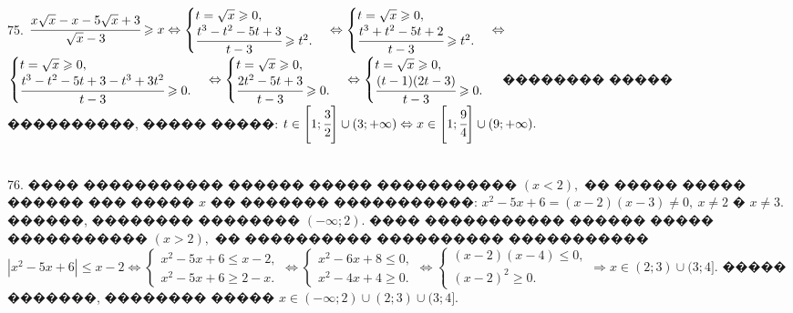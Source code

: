 \documentclass[12pt]{article}
\begin{document}
\begin{figure}[ht!]
\end{figure}\\
75. $\cfrac{x\sqrt{x}-x-5\sqrt{x}+3}{\sqrt{x}-3}\geqslant x \Leftrightarrow \begin{cases} t=\sqrt{x}\geqslant0,\\ \cfrac{t^3-t^2-5t+3}{t-3}\geqslant t^2.\end{cases}
\Leftrightarrow \begin{cases} t=\sqrt{x}\geqslant0,\\ \cfrac{t^3+t^2-5t+2}{t-3}\geqslant t^2.\end{cases}
\Leftrightarrow$\\$ \begin{cases} t=\sqrt{x}\geqslant0,\\ \cfrac{t^3-t^2-5t+3-t^3+3t^2}{t-3}\geqslant 0.\end{cases}
\Leftrightarrow \begin{cases} t=\sqrt{x}\geqslant0,\\ \cfrac{2t^2-5t+3}{t-3}\geqslant 0.\end{cases}
\Leftrightarrow \begin{cases} t=\sqrt{x}\geqslant0,\\ \cfrac{(t-1)(2t-3)}{t-3}\geqslant 0.\end{cases}$ �������� ����� ����������, ����� �����: $t\in\left[1;\cfrac{3}{2}\right]\cup(3;+\infty)\Leftrightarrow x \in\left[1;\cfrac{9}{4}\right]\cup(9;+\infty).$
\begin{figure}[ht!]
\end{figure}\\
76. ���� ����������� ������ ����� ����������� $(x<2),$ �� ����� ����� ������ ��� ����� $x$ �� ������� �����������: $x^2-5x+6=(x-2)(x-3)\neq0,\ x\neq2$ � $x\neq3.$ ������, �������� �������� $(-\infty;2).$ ���� ����������� ������ ����� ����������� $(x>2),$ �� ���������� ���������� ����������� $|x^2-5x+6|\leqslant x-2\Leftrightarrow \begin{cases} x^2-5x+6\leqslant x-2,\\ x^2-5x+6\geqslant 2-x.\end{cases}\Leftrightarrow \begin{cases} x^2-6x+8\leqslant0,\\ x^2-4x+4\geqslant0.\end{cases}
\Leftrightarrow \begin{cases} (x-2)(x-4)\leqslant0,\\ (x-2)^2\geqslant0.\end{cases}\Rightarrow x\in(2;3)\cup(3;4].$ ����� �������, �������� ����� $x\in(-\infty;2)\cup (2;3)\cup(3;4].$\newpage\noindent
\end{document}
